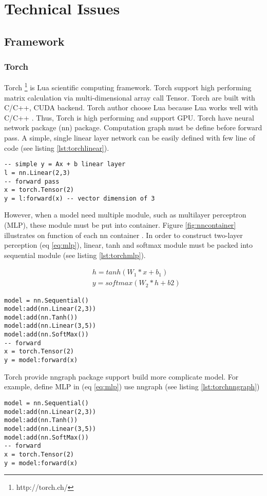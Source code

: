 \chapter{Technical Issues}
\section{Framework}

\subsection{Torch}
Torch \footnote{http://torch.ch/} is Lua scientific computing framework. Torch support high performing matrix calculation via multi-dimensional array call Tensor. Torch are built with C/C++, CUDA backend. Torch author choose Lua because Lua works well with C/C++ \cite{collobert2011torch7}.  Thus, Torch is high performing and support GPU. Torch have neural network package (nn) package. Computation graph must be define before forward pass. 
A simple, single linear layer network can be easily defined with few line of code (see listing \ref{lst:torchlinear}).

\begin{lstlisting}[caption={Simple linear layer in Torch},label={lst:torchlinear}, language={[5.1]Lua}]
-- simple y = Ax + b linear layer
l = nn.Linear(2,3)
-- forward pass
x = torch.Tensor(2)
y = l:forward(x) -- vector dimension of 3
\end{lstlisting}

However, when a model need multiple module, such as multilayer perceptron (MLP), these module must be put into container. Figure \ref{fig:nncontainer} illustrates on function of each nn container . In order to construct two-layer perception (eq \ref{eq:mlp}), linear, tanh and softmax module must be packed into sequential module (see listing \ref{lst:torchmlp}).

\begin{equation}
\label{eq:mlp}
\begin{aligned}
&h = tanh(W_1*x + b_1) \\
&y = softmax(W_2*h + b2)
\end{aligned}
\end{equation}


\begin{lstlisting}[caption={MLP in Torch},label={lst:torchmlp}, language={[5.1]Lua}]
model = nn.Sequential()
model:add(nn.Linear(2,3))
model:add(nn.Tanh())
model:add(nn.Linear(3,5))
model:add(nn.SoftMax())
-- forward
x = torch.Tensor(2)
y = model:forward(x)
\end{lstlisting}

Torch provide nngraph package support build more complicate model. For example, define MLP in (eq \ref{eq:mlp}) use nngraph (see listing \ref{lst:torchnngraph})

\begin{lstlisting}[caption={MLP using nngraph},label={lst:torchnngraph}, language={[5.1]Lua}]
model = nn.Sequential()
model:add(nn.Linear(2,3))
model:add(nn.Tanh())
model:add(nn.Linear(3,5))
model:add(nn.SoftMax())
-- forward
x = torch.Tensor(2)
y = model:forward(x)
\end{lstlisting}